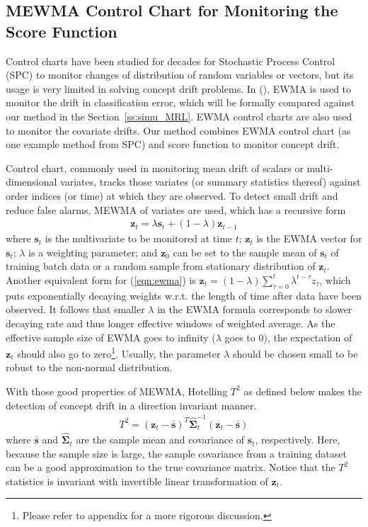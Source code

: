 \documentclass[twoside,11pt]{article}
\begin{document}
\subsection{MEWMA Control Chart for Monitoring the Score Function}
\label{ss:MEWMA}
%

Control charts have been studied for decades for Stochastic Process Control (SPC) to monitor changes of distribution of random variables or vectors, but its usage is very limited in solving concept drift problems. In (\cite{ross2012exponentially}), EWMA is used to monitor the drift in classification error, which will be formally compared against our method in the Section~\ref{ss:simu_MRL}. EWMA control charts are also used to monitor the covariate drifts. Our method combines EWMA control chart (as one example method from SPC) and score function to monitor concept drift.

Control chart, commonly used in monitoring mean {drift} of scalars or multi-dimensional variates, tracks those variates (or summary statistics thereof) against order indices (or time) at which they are observed. To detect small {drift} and reduce false alarms, MEWMA of variates are used, which has a recursive form
\begin{align}
\bm {z}_t = \lambda \bm {s}_t + (1 - \lambda) \bm {z} _{t-1}
\label{eqn:ewma}
\end{align}
where $\bm {s}_t$ is the {multivariate} to be monitored at time $t$; {$\bm {z}_t$ is the EWMA vector for $\bm {s}_t$}; $ \lambda$ is a weighting parameter; and $\bm{z}_0$ can be set to the sample mean of $\bm {s}_t$ of training batch data or a random sample from stationary distribution of $\bm {z}_t$. Another equivalent form for (\ref{eqn:ewma}) is $\bm {z}_t = (1- \lambda)\sum _{\tau=0}^t \lambda ^{t-\tau} z _{\tau}$, which puts exponentially decaying weights w.r.t. the length of time after data have been observed. It follows that smaller $\lambda$ in the EWMA formula corresponds to slower decaying rate and thus longer effective windows of weighted average. As the effective sample size of EWMA goes to infinity ($ \lambda$ goes to $0$), the expectation of $\bm {z}_t$ should also go to zero\footnote{Please refer to appendix for a more rigorous discussion.}. Usually, the parameter $\lambda$ should be chosen small to be robust to the non-normal distribution. 


With those good properties of MEWMA, Hotelling $T^2$ as defined below makes the detection of concept drift in a direction invariant manner.
\begin{align}
T^2 = (\bm {z}_t-\bar { \bm {s}})^T \hat {\bm { \Sigma}} ^{-1}_{t}(\bm {z}_t-\bar { \bm {s}})
\label{eqn:hotellingt2}
\end{align}
where $\bar {\bm{s}}$ and $\hat {\bm {\Sigma}} _{t}$ are the sample mean and covariance of $\bm {s}_t$, respectively. Here, because the sample size is large, the sample covariance from a training dataset can be a good approximation to the true covariance matrix. Notice that the $T^2$ statistics is invariant with invertible linear transformation of $\bm {z}_t$. 
\end{document}
